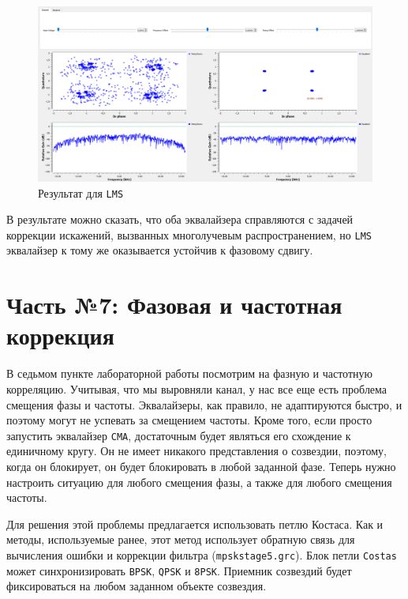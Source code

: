 \documentclass[a4paper]{article}
\begin{document}
            \begin{figure}[H]
                \centering
                \includegraphics[width=\textwidth]{ex_6_4.png}
                \caption{Результат для \texttt{LMS}}
                \label{fig:ex_6_4}
            \end{figure}
            
            В результате можно сказать, что оба эквалайзера справляются с задачей коррекции искажений, вызванных многолучевым распространением, но \texttt{LMS} эквалайзер к тому же оказывается устойчив к фазовому сдвигу.

    \newpage
        \section{Часть №7: Фазовая и частотная коррекция}
            В седьмом пункте лабораторной работы посмотрим на фазную и частотную корреляцию. Учитывая, что мы выровняли канал, у нас все еще есть проблема смещения фазы и частоты. Эквалайзеры, как правило, не адаптируются быстро, и поэтому могут не успевать за смещением частоты. Кроме того, если просто запустить эквалайзер \texttt{CMA}, достаточным будет являться его схождение к единичному кругу. Он не имеет никакого представления о созвездии, поэтому, когда он блокирует, он будет блокировать в любой заданной фазе. Теперь нужно настроить ситуацию для любого смещения фазы, а также для любого смещения частоты.
            
            Для решения этой проблемы предлагается использовать петлю Костаса. Как и методы, используемые ранее, этот метод использует обратную связь для вычисления ошибки и коррекции фильтра (\texttt{mpskstage5.grc}). Блок петли \texttt{Costas} может синхронизировать \texttt{BPSK}, \texttt{QPSK} и \texttt{8PSK}. Приемник созвездий будет фиксироваться на любом заданном объекте созвездия.
            
\end{document}
